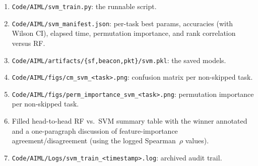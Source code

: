 \documentclass[11pt,letterpaper]{article}
\begin{document}
\begin{tcolorbox}[deliverable={Lab Handout 4-D Deliverable}]
	\begin{enumerate}[leftmargin=1.2em]
		\item \texttt{Code/AIML/svm\_train.py}: the runnable script.
		\item \texttt{Code/AIML/svm\_manifest.json}: per-task best params, accuracies (with Wilson CI), elapsed time, permutation importance, and rank correlation versus RF.
		\item \texttt{Code/AIML/artifacts/\{sf,beacon,pkt\}/svm.pkl}: the saved models.
		\item \texttt{Code/AIML/figs/cm\_svm\_<task>.png}: confusion matrix per non-skipped task.
		\item \texttt{Code/AIML/figs/perm\_importance\_svm\_<task>.png}: permutation importance per non-skipped task.
		\item Filled head-to-head RF vs.\ \mbox{SVM} summary table with the winner annotated and a one-paragraph discussion of feature-importance agreement/disagreement (using the logged Spearman~$\rho$ values).
		\item \texttt{Code/AIML/Logs/svm\_train\_<timestamp>.log}: archived audit trail.
	\end{enumerate}
\end{tcolorbox}

\printhandoutglossary
\end{document}
